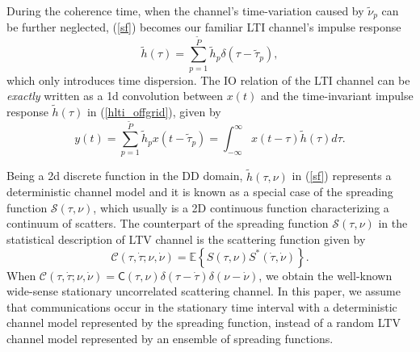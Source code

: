 \documentclass[journal]{IEEEtran}
\begin{document}
During the coherence time, when the channel's time-variation caused by $\tilde \nu_p$ can be further neglected, (\ref{sf}) becomes our familiar LTI channel's impulse response
\begin{equation} \label{hlti_offgrid}
  \tilde h(\tau)=\sum_{p=1}^{\tilde P} \tilde h_p \delta (\tau-{\tilde \tau}_p),
\end{equation}
which only introduces time dispersion.
The IO relation of the LTI channel can be \emph{exactly} written as a \ac{1d} convolution between $x(t)$ and the time-invariant impulse response $\tilde h(\tau)$ in (\ref{hlti_offgrid}), given by
\begin{equation}
  y(t)=\sum_{p=1}^{\tilde P}\tilde h_p x(t-\tilde \tau_p)=\int_{-\infty}^{\infty} x(t-\tau)\tilde h(\tau) d\tau.
\end{equation}

Being a \ac{2d} discrete function in the DD domain, $\tilde h(\tau,\nu)$ in (\ref{sf}) represents a deterministic channel model and it is known as a special case of the spreading function $\mathcal S(\tau,\nu)$, which usually is a 2D continuous function characterizing a continuum of scatters\cite{Hlawatsch2011}. The counterpart of the spreading function $\mathcal S(\tau,\nu)$ in the statistical description of LTV channel is the scattering function given by \cite{bello}
\begin{equation}
  \mathcal C(\tau, \dot \tau; \nu, \dot \nu)=\mathbb E\left\{S(\tau,\nu)S^*(\dot \tau,\dot \nu)\right\}.
\end{equation}
When $\mathcal C(\tau,\dot \tau; \nu, \dot \nu)=\mathsf C(\tau,\nu)\delta (\tau-\dot \tau)\delta (\nu-\dot \nu)$,
we obtain the well-known wide-sense stationary uncorrelated scattering channel.
In this paper, we assume that communications occur in the stationary time interval with a deterministic channel model represented by the spreading function, instead of a random LTV channel model represented by an ensemble of spreading functions.
\end{document}
